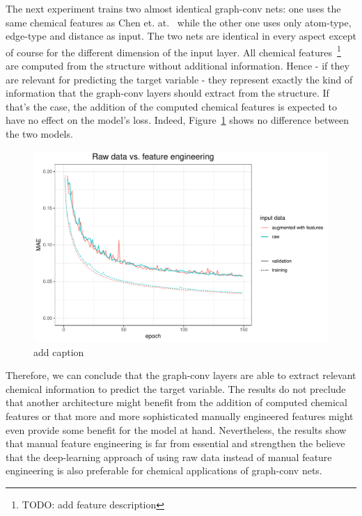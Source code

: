 The next experiment trains two almost identical graph-conv nets: one uses the same chemical features as Chen et. at.~\cite{Chen2019} while the other one uses only atom-type, edge-type and distance as input. The two nets are identical in every aspect except of course for the different dimension of the input layer. All chemical features~\footnote{TODO: add feature description} are computed from the structure without additional information. Hence - if they are relevant for predicting the target variable - they represent exactly the kind of information that the graph-conv layers should extract from the structure. If that's the case, the addition of the computed chemical features is expected to have no effect on the model's loss. Indeed, Figure~\ref{fig:raw-data} shows no difference between the two models.

\begin{figure}[H]
	\includegraphics[width=\linewidth]{figures/raw-data}
	\caption{add caption}
	\label{fig:raw-data}
\end{figure}

Therefore, we can conclude that the graph-conv layers are able to extract relevant chemical information to predict the target variable. The results do not preclude that another architecture might benefit from the addition of computed chemical features or that more and more sophisticated manually engineered features might even provide some benefit for the model at hand. Nevertheless, the results show that manual feature engineering is far from essential and strengthen the believe that the deep-learning approach of using raw data instead of manual feature engineering is also preferable for chemical applications of graph-conv nets.


